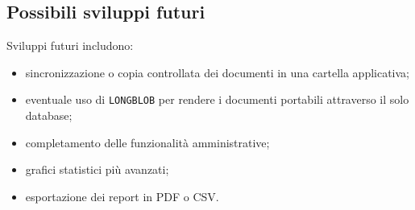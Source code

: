 \documentclass[11pt,a4paper]{article}
\begin{document}
\subsection{Possibili sviluppi futuri}
Sviluppi futuri includono:
\begin{itemize}
    \item sincronizzazione o copia controllata dei documenti in una cartella applicativa;
    \item eventuale uso di \texttt{LONGBLOB} per rendere i documenti portabili attraverso il solo database;
    \item completamento delle funzionalità amministrative;
    \item grafici statistici più avanzati;
    \item esportazione dei report in PDF o CSV.
\end{itemize}
\end{document}
